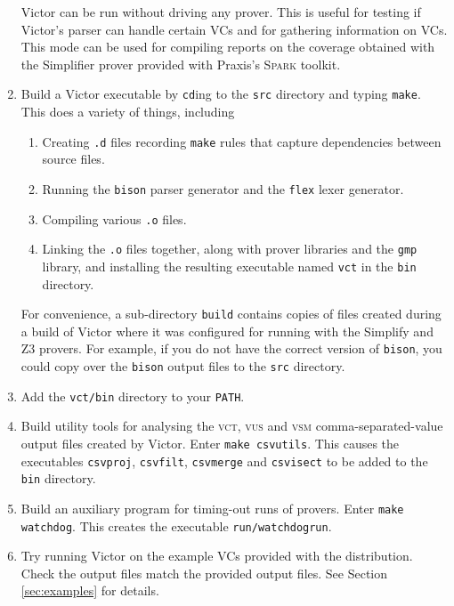 \documentclass[12pt,fleqn]{article}
\newcommand{\spark}{\textsc{Spark}}
\newcommand{\zthree}{\textsc{Z}3}
\newcommand{\goalreportfile}{\textsc{vct}}
\newcommand{\unitsumfile}{\textsc{vus}}
\newcommand{\sessionsumfile}{\textsc{vsm}}
\begin{document}
\begin{enumerate}
  Victor can be run without driving any prover.  This is useful for
  testing if Victor's parser can handle certain VCs and for gathering
  information on VCs.  This mode can be used for compiling reports on
  the coverage obtained with the Simplifier prover provided with
  Praxis's \spark{} toolkit.

\item Build a Victor executable by \texttt{cd}ing to the \texttt{src}
  directory and typing \texttt{make}.  This does a variety of things, including
  \begin{enumerate}
  \item Creating \texttt{.d} files recording \texttt{make} rules that
     capture dependencies between source files.
   \item Running the \texttt{bison} parser generator and the \texttt{flex}
     lexer generator.
   \item Compiling various \texttt{.o} files.
   \item Linking the \texttt{.o} files together, along with prover
     libraries and the \texttt{gmp} library, and installing the
     resulting executable named \texttt{vct} in the \texttt{bin}
     directory.
  \end{enumerate}
  For convenience, a sub-directory \texttt{build} contains copies
  of files created during a build of Victor where it was configured
  for running with the Simplify and \zthree{} provers.  For example, if you
  do not have the correct version of \texttt{bison}, you could copy over
  the \texttt{bison} output files to the \texttt{src} directory.


\item Add the \texttt{vct/bin} directory to your \texttt{PATH}.


\item Build utility tools for analysing the \goalreportfile{},
  \unitsumfile{} and \sessionsumfile{} comma-separated-value output
  files created by Victor.  Enter \texttt{make csvutils}.  This causes
  the executables \texttt{csvproj}, \texttt{csvfilt},
  \texttt{csvmerge} and \texttt{csvisect} to be added to the
  \texttt{bin} directory.

\item Build an auxiliary program for timing-out runs of provers.
  Enter \texttt{make watchdog}.  This creates the executable
  \texttt{run/watchdogrun}.

\item Try running Victor on the example VCs provided with the distribution.
  Check the output files match the provided output files.  See Section
  \ref{sec:examples}
  for details.
\end{enumerate}
\end{document}
